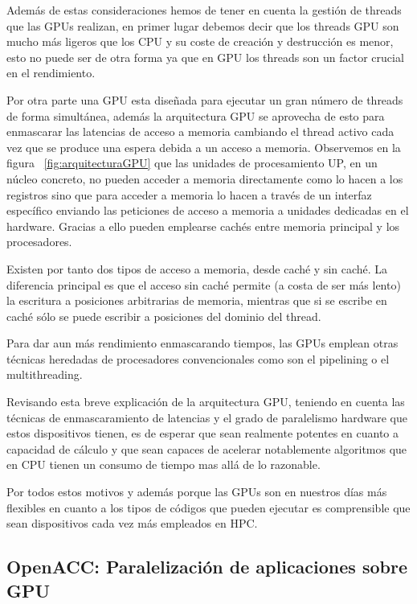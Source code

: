 Además de estas consideraciones hemos de tener en cuenta la gestión de threads que las GPUs realizan, en primer lugar debemos decir que los threads GPU son mucho más ligeros que los CPU y su coste de creación y destrucción es menor, esto no puede ser de otra forma ya que en GPU los threads son un factor crucial en el rendimiento.

Por otra parte una GPU esta diseñada para ejecutar un gran número de threads de forma simultánea, además la arquitectura GPU se aprovecha de esto para enmascarar las latencias de acceso a memoria cambiando el thread activo cada vez que se produce una espera debida a un acceso a memoria. Observemos en la figura ~\ref{fig:arquitecturaGPU} que las unidades de procesamiento UP, en un núcleo concreto, no pueden acceder a memoria directamente como lo hacen a los registros sino que para acceder a memoria lo hacen a través de un interfaz específico enviando las peticiones de acceso a memoria a unidades dedicadas en el hardware. Gracias a ello pueden emplearse cachés entre memoria principal y los procesadores.

Existen por tanto dos tipos de acceso a memoria, desde caché y sin caché. La diferencia principal es que el acceso sin caché permite (a costa de ser más lento) la escritura a posiciones arbitrarias de memoria, mientras que si se escribe en caché sólo se puede escribir a posiciones del dominio del thread.


Para dar aun más rendimiento enmascarando tiempos, las GPUs emplean otras técnicas heredadas de procesadores convencionales como son el pipelining o el multithreading.

Revisando esta breve explicación de la arquitectura GPU, teniendo en cuenta las técnicas de enmascaramiento de latencias y el grado de paralelismo hardware que estos dispositivos tienen, es de esperar que sean realmente potentes en cuanto a capacidad de cálculo y que sean capaces de acelerar notablemente algoritmos que en CPU tienen un consumo de tiempo mas allá de lo razonable.

Por todos estos motivos y además porque las GPUs son en nuestros días más flexibles en cuanto a los tipos de códigos que pueden ejecutar es comprensible que sean dispositivos cada vez más empleados en HPC.

\subsection{OpenACC: Paralelización de aplicaciones sobre GPU}

